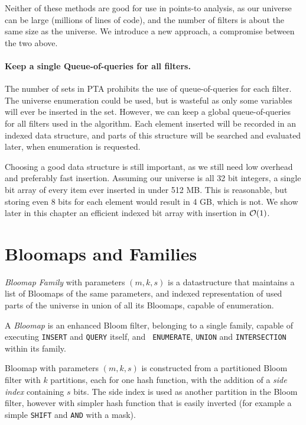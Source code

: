Neither of these methods are good for use in points-to analysis, as our universe
can be large (millions of lines of code), and the number of filters is about the
same size as the universe. We introduce a new approach, a compromise between the
two above.

\paragraph{Keep a single Queue-of-queries for all filters.} The number of sets
in PTA prohibits the use of queue-of-queries for each filter. The universe
enumeration could be used, but is wasteful as only some variables will ever be
inserted in the set. However, we can keep a global queue-of-queries for all
filters used in the algorithm. Each element inserted will be recorded in an
indexed data structure, and parts of this structure will be searched and
evaluated later, when enumeration is requested.

Choosing a good data structure is still important, as we still need low overhead
and preferably fast insertion. Assuming our universe is all 32 bit integers, a
single bit array of every item ever inserted in under 512 MB. This is
reasonable, but storing even 8 bits for each element would result in 4 GB, which
is not. We show later in this chapter an efficient indexed bit array with
insertion in $\mathcal{O}(1)$.


\section{Bloomaps and Families}

{\it Bloomap Family} with parameters $(m, k, s)$ is a datastructure that
maintains a list of Bloomaps of the same parameters, and indexed representation
of used parts of the universe in union of all its Bloomaps, capable of
enumeration.

A {\it Bloomap} is an enhanced Bloom filter, belonging to a single
family, capable of executing {\tt INSERT} and {\tt QUERY} itself, and {\tt
ENUMERATE}, {\tt UNION} and {\tt INTERSECTION} within its family.

Bloomap with parameters $(m, k, s)$ is constructed from a partitioned Bloom
filter with $k$ partitions, each for one hash function, with the addition of a
{\it side index} containing $s$ bits. The side index is used as another
partition in the Bloom filter, however with simpler hash function that is easily
inverted (for example a simple {\tt SHIFT} and {\tt AND} with a mask).

